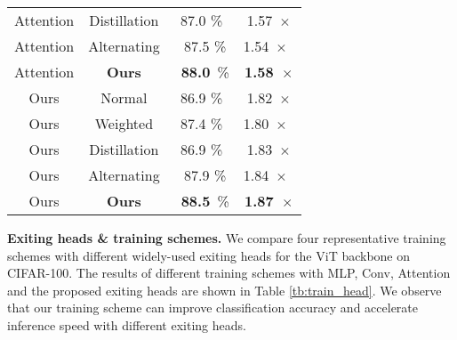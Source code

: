\begin{table}[t]
\begin{tabular}{cccc}
    Attention                                   & Distillation              & 87.0 \%           & 1.57~$\times$           \\
    Attention                                   & Alternating               & ~87.5 \%          & 1.54~$\times$~          \\
    \rowcolor[rgb]{0.949,0.949,0.949} Attention & \textbf{Ours}             & ~\textbf{88.0}~\% & \textbf{1.58~}$\times$  \\ 
    \hline
    Ours                                        & Normal                    & 86.9 \%           & 1.82~$\times$           \\
    Ours                                        & Weighted                  & 87.4 \%           & 1.80~$\times$~          \\
    Ours                                        & Distillation              & 86.9 \%           & 1.83~$\times$           \\
    Ours                                        & Alternating               & ~87.9 \%          & 1.84~$\times$~          \\
    \rowcolor[rgb]{0.949,0.949,0.949} Ours      & \textbf{Ours}             & ~\textbf{88.5}~\% & \textbf{1.87~}$\times$  \\
    \bottomrule
    \end{tabular}
    \vspace{-5pt}
    \end{table}

\textbf{Exiting heads \& training schemes.} We compare four representative training schemes with different widely-used exiting heads for the ViT backbone on CIFAR-100. 
The results of different training schemes with MLP, Conv, Attention and the proposed exiting heads are shown in Table \ref{tb:train_head}. 
We observe that our training scheme can improve classification accuracy and accelerate inference speed with different exiting heads. 



